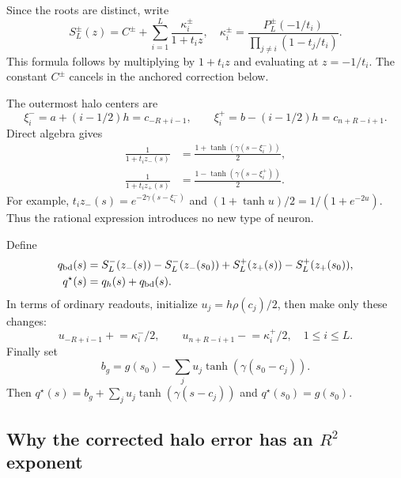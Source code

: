 \documentclass[11pt]{article}
\begin{document}
Since the roots are distinct, write
\begin{equation}
 S_L^\pm(z)=C^\pm+\sum_{i=1}^L\frac{\kappa_i^\pm}{1+t_i z},
 \quad
 \kappa_i^\pm=\frac{P_L^\pm(-1/t_i)}{\prod_{j\ne i}(1-t_j/t_i)}.
 \label{eq:partial-fractions}
\end{equation}
This formula follows by multiplying by $1+t_i z$ and evaluating at $z=-1/t_i$. The constant $C^\pm$ cancels in the anchored correction below.

The outermost halo centers are
\[
 \xi_i^-=a+(i-1/2)h=c_{-R+i-1},\qquad
 \xi_i^+=b-(i-1/2)h=c_{n+R-i+1}.
\]
Direct algebra gives
\begin{align}
 \frac1{1+t_i z_-(s)}&=\frac{1+\tanh(\gamma(s-\xi_i^-))}{2},\\
 \frac1{1+t_i z_+(s)}&=\frac{1-\tanh(\gamma(s-\xi_i^+))}{2}.
 \label{eq:rational-is-tanh}
\end{align}
For example, $t_i z_-(s)=e^{-2\gamma(s-\xi_i^-)}$ and
$(1+\tanh u)/2=1/(1+e^{-2u})$. Thus the rational expression introduces no new type of neuron.

Define
\begin{align}
 q_{\rm bd}(s)&=S_L^-(z_-(s))-S_L^-(z_-(s_0))
 +S_L^+(z_+(s))-S_L^+(z_+(s_0)),\\
 q^\star(s)&=q_h(s)+q_{\rm bd}(s).
\end{align}
In terms of ordinary readouts, initialize $u_j=h\rho(c_j)/2$, then make only these changes:
\begin{equation}
 \boxed{u_{-R+i-1}\mathrel{+}=\kappa_i^-/2,\qquad
 u_{n+R-i+1}\mathrel{-}=\kappa_i^+/2,\quad 1\le i\le L.}
 \label{eq:halo-readouts}
\end{equation}
Finally set
\begin{equation}
 b_g=g(s_0)-\sum_j u_j\tanh(\gamma(s_0-c_j)).
 \label{eq:profile-bias}
\end{equation}
Then $q^\star(s)=b_g+\sum_j u_j\tanh(\gamma(s-c_j))$ and $q^\star(s_0)=g(s_0)$.

\subsection{Why the corrected halo error has an \texorpdfstring{$R^2$}{R-squared} exponent}
\end{document}
